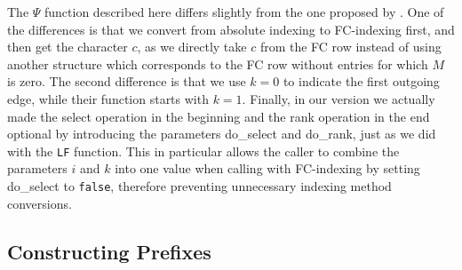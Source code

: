 \documentclass[a4paper,12pt,twoside,BCOR=10mm]{scrbook}
\begin{document}
The $ \Psi $ function described here differs slightly from the one proposed by \citet{Siren2014}. 
One of the differences is that we convert from absolute indexing to FC-indexing first, 
and then get the character $ c $, as we directly take $ c $ from the FC row instead 
of using another structure which corresponds to the FC row without entries for which $ M $ is zero. 
The second difference is that we use $ k \boldsymbol{=} 0 $ to indicate the first outgoing edge, 
while their function starts with $ k \boldsymbol{=} 1 $. 
Finally, in our version we actually made the select operation in the beginning and the rank operation in 
the end optional by introducing the parameters do\_select and do\_rank, 
just as we did with the \texttt{LF} function. 
This in particular allows the caller to combine the parameters $ i $ and $ k $ into one value 
when calling with FC-indexing by setting do\_select to \texttt{false}, 
therefore preventing unnecessary indexing method conversions.


\subsection{Constructing Prefixes}
\label{sec:gml_flat_construct_prefixes}
\end{document}
